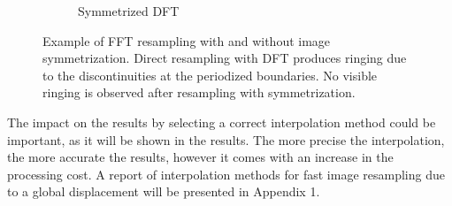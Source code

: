 \begin{figure}[htpb]
\begin{subfigure}[b]{0.24\textwidth}
  \caption{Symmetrized DFT}
  \label{fig:dctresampling}
  \end{subfigure}
  \caption{Example of FFT resampling with and without image symmetrization. Direct resampling with DFT produces ringing due to the discontinuities at the periodized boundaries. No visible ringing is observed after resampling with symmetrization.}
  \label{fig:DCTShift}
\end{figure}

The impact on the results by selecting a correct interpolation method could be important, as it will be shown in the results. The more precise the interpolation, the more accurate the results, however it comes with an increase in the processing cost. A report of interpolation methods for fast image resampling due to a global displacement will be presented in Appendix 1.

